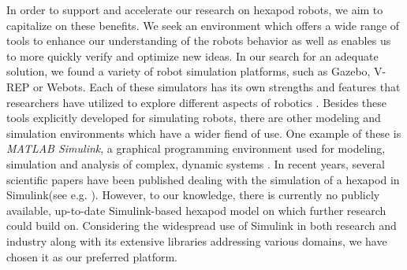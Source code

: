 In order to support and accelerate our research on hexapod robots, we aim to capitalize on these benefits.
We seek an environment which offers a wide range of tools to enhance our understanding of the robots behavior as well as enables us to more quickly verify and optimize new ideas.
In our search for an adequate solution, we found a variety of robot simulation platforms, such as Gazebo, V-REP or Webots. 
Each of these simulators has its own strengths and features that researchers have utilized to explore different aspects of robotics \parencite{de2019analysis}.
Besides these tools explicitly developed for simulating robots, there are other modeling and simulation environments which have a wider fiend of use.
One example of these is \textit{MATLAB Simulink\textsuperscript{\textregistered}}, a graphical programming environment used for modeling, simulation and analysis of complex, dynamic systems \parencite{Simulink}.
In recent years, several scientific papers have been published dealing with the simulation of a hexapod in Simulink(see e.g. \cite{tanaka2019development, barai2013smart, atify2019propelling}).
However, to our knowledge, there is currently no publicly available, up-to-date Simulink-based hexapod model on which further research could build on.
Considering the widespread use of Simulink in both research and industry along with its extensive libraries addressing various domains, we have chosen it as our preferred platform.




